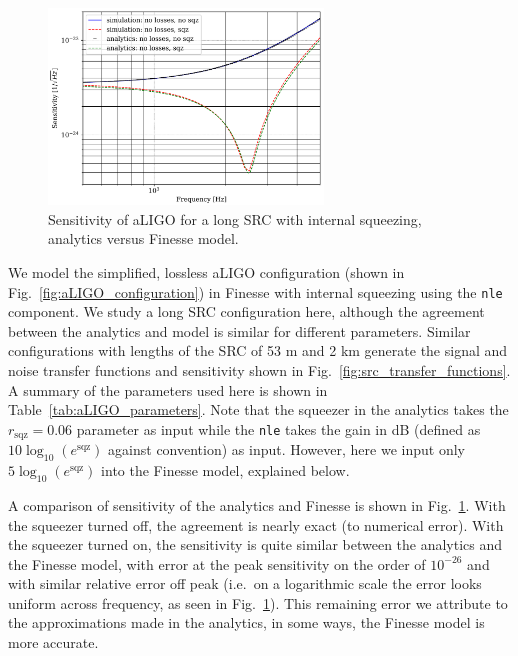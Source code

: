 \documentclass[aps,pra,superscriptaddress,reprint,nofootinbib]{revtex4-1}
\newcommand{\code}[1]{\texttt{#1}}
\begin{document}
\begin{figure}
	\begin{center}
	\includegraphics[width=0.65\textwidth]{figures/sqz_aLIGO_analytics_v_simulation.pdf}
	\end{center}
	\caption{Sensitivity of aLIGO for a long SRC with internal squeezing, analytics versus Finesse model.}
	\label{fig:sqz_aLIGO_analytics_v_simulation}
\end{figure}

We model the simplified, lossless aLIGO configuration (shown in Fig.~\ref{fig:aLIGO_configuration}) in Finesse with internal squeezing using the \code{nle} component. We study a long SRC configuration here, although the agreement between the analytics and model is similar for different parameters. Similar configurations with lengths of the SRC of 53 m and 2 km generate the signal and noise transfer functions and sensitivity shown in Fig.~\ref{fig:src_transfer_functions}. A summary of the parameters used here is shown in Table~\ref{tab:aLIGO_parameters}. Note that the squeezer in the analytics takes the $r_\mathrm{sqz} = 0.06$ parameter as input while the \code{nle} takes the gain in dB (defined as $10 \log_{10}(e^\mathrm{sqz})$ against convention) as input. However, here we input only $5 \log_{10}(e^\mathrm{sqz})$ into the Finesse model, explained below.


A comparison of sensitivity of the analytics and Finesse is shown in Fig.~\ref{fig:sqz_aLIGO_analytics_v_simulation}. With the squeezer turned off, the agreement is nearly exact (to numerical error). With the squeezer turned on, the sensitivity is quite similar between the analytics and the Finesse model, with error at the peak sensitivity on the order of $10^{-26}$ and with similar relative error off peak (i.e.\ on a logarithmic scale the error looks uniform across frequency, as seen in Fig.~\ref{fig:sqz_aLIGO_analytics_v_simulation}). This remaining error we attribute to the approximations made in the analytics, in some ways, the Finesse model is more accurate.
\end{document}
